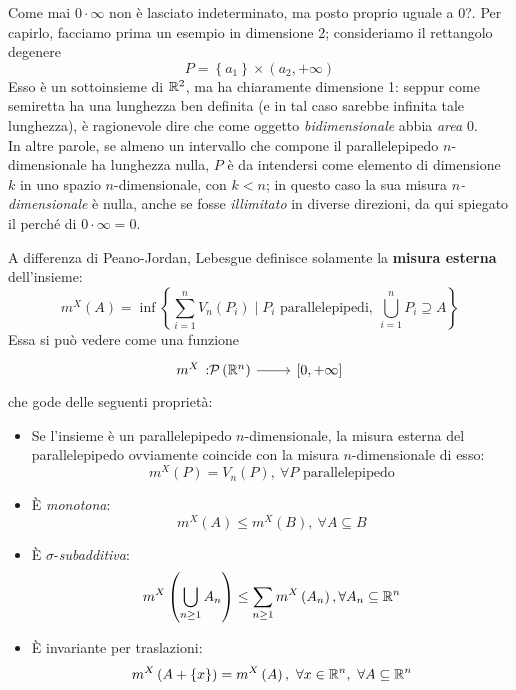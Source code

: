 	\begin{observe}
		Come mai $0\cdot \infty$ non è lasciato indeterminato, ma posto proprio uguale a 0?. Per capirlo, facciamo prima un esempio in dimensione 2; consideriamo il rettangolo degenere
		\begin{equation*}
			P=\left\{a_1\right\}\times\left(a_2,+\infty\right)
		\end{equation*}
		Esso è un sottoinsieme di $\mathbb{R}^2$, ma ha chiaramente dimensione 1: seppur come semiretta ha una lunghezza ben definita (e in tal caso sarebbe infinita tale lunghezza), è ragionevole dire che come oggetto \textit{bidimensionale} abbia \textit{area} $0$.\\
		In altre parole, se almeno un intervallo che compone il parallelepipedo $n$-dimensionale ha lunghezza nulla, $P$ è da intendersi come elemento di dimensione $k$ in uno spazio $n$-dimensionale, con $k< n$; in questo caso la sua misura $n$\textit{-dimensionale} è nulla, anche se fosse \textit{illimitato} in diverse direzioni, da qui spiegato il perché di $0\cdot \infty =0$.
	\end{observe}
	A differenza di Peano-Jordan, Lebesgue definisce solamente la \textbf{misura esterna} dell'insieme:
	\begin{equation*}
		m^X\left(A\right)=\inf\left\{\sum_{i=1}^{n}V_n\left(P_i\right)\mid P_i\text{ parallelepipedi},\ \bigcup_{i=1}^nP_i\supseteq A\right\}
	\end{equation*}
	Essa si può vedere come una funzione
	\begin{equation}
		\funz{m^X}{\setpart{\realset^n}}{\left[0,+\infty\right]}
	\end{equation}
	che gode delle seguenti proprietà:
	\begin{itemize}
		\item Se l'insieme è un parallelepipedo $n$-dimensionale, la misura esterna del parallelepipedo ovviamente coincide con la misura $n$-dimensionale di esso:
		\begin{equation}
			m^X\left(P\right)=V_n\left(P\right),\ \forall P\text{ parallelepipedo}
		\end{equation}
		\item È \textit{monotona}:
		\begin{equation}
			m^X\left(A\right)\leq m^X\left(B\right),\ \forall A\subseteq B
		\end{equation}
		\item È $\sigma$-\textit{subadditiva}:
		\begin{equation}
			m^X\left(\bigcup_{n\geq 1}A_n\right)\leq \sum_{n\geq 1}m^X\left(A_n\right), \forall A_n\subseteq \mathbb{R}^n
		\end{equation}
		\item È invariante per traslazioni:
		\begin{equation}
			m^X\left(A+\left\{x\right\}\right)=m^X\left(A\right),\ \forall x\in\realset^n,\ \forall A\subseteq\realset^n
		\end{equation}
	\end{itemize}
